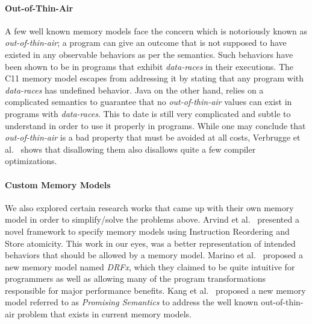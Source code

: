     \paragraph{Out-of-Thin-Air }
    A few well known memory models face the concern which is notoriously known as \textit{out-of-thin-air}; a program can give an outcome that is not supposed to have existed in any observable behaviors as per the semantics. %
    Such behaviors have been shown to be in programs that exhibit \textit{data-races} in their executions.
    The C11 memory model \cite{C11MM} escapes from addressing it by stating that any program with \textit{data-races} has undefined behavior.
    Java on the other hand, relies on a complicated semantics to guarantee that no \textit{out-of-thin-air} values can exist in programs with \textit{data-races}. This to date is still very complicated and subtle to understand in order to use it properly in programs. 
    While one may conclude that \textit{out-of-thin-air} is a bad property that must be avoided at all costs, Verbrugge et al.~\cite{Verbrugge} shows that disallowing them also disallows quite a few compiler optimizations.

    \paragraph{Custom Memory Models}
    We also explored certain research works that came up with their own memory model in order to simplify/solve the problems above. 
    Arvind et al.~\cite{Arvind} presented a novel framework to specify memory models using Instruction Reordering and Store atomicity. This work in our eyes, was a better representation of intended behaviors that should be allowed by a memory model. 
    Marino et al.~\cite{Marino} proposed a new memory model named \textit{DRFx}, which they claimed to be quite intuitive for programmers as well as allowing many of the program transformations responsible for major performance benefits.
    Kang et al.~\cite{Kang} proposed a new memory model referred to as \textit{Promising Semantics} to address the well known out-of-thin-air problem that exists in current memory models. 